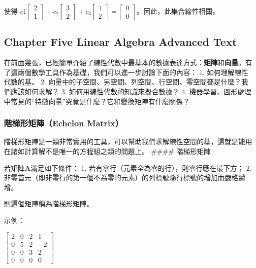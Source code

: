 \documentclass[11pt]{article}
\begin{document}
{使得
\(c1 \begin{bmatrix}2 \\ 1\end{bmatrix} + c_2 \begin{bmatrix}3 \\ 2\end{bmatrix} + c_3 \begin{bmatrix}1 \\ 2 \end{bmatrix} = \begin{bmatrix}0 \\ 0\end{bmatrix}\)。因此，此集合線性相關。

    \hypertarget{chapter-five-linear-algebra-advanced-text}{%
\subsection{Chapter Five Linear Algebra Advanced
Text}\label{chapter-five-linear-algebra-advanced-text}}

在前面幾張，已經簡單介紹了線性代數中最基本的數據表達方式：\textbf{矩陣}和\textbf{向量}。有了這兩個數學工具作為基礎，我們可以進一步討論下面的內容：
1. 如何理解線性代數的基。 2.
向量中的子空間、另空間、列空間、行空間、零空間都是什麼？我們應該如何求解？
3. 如何用線性代數的知識來擬合數據？ 4.
機器學習、圖形處理中常見的``特徵向量''究竟是什麼？它和變換矩陣有什麼關係？

    \hypertarget{ux968eux68afux5f62ux77e9ux9663echelon-matrix}{%
\subsubsection{階梯形矩陣（Echelon
Matrix）}\label{ux968eux68afux5f62ux77e9ux9663echelon-matrix}}

階梯形矩陣是一類非常實用的工具，可以幫助我們求解線性空間的基，這就是能用在諸如計算解不是唯一的方程組之類的問題上。
\#\#\#\# 階梯形矩陣

若矩陣\(\mathbf{A}\)滿足如下條件： 1.
若有零行（元素全為零的行），則零行應在最下方； 2.
非零首元（即非零行的第一個不為零的元素）的列標號隨行標號的增加而嚴格遞增。

則這個矩陣稱為階梯形矩陣。

    示例：

\(\begin{bmatrix} 2 & 0 & 2 & 1 \\ 0 & 5 & 2 & -2 \\ 0 & 0 & 3 & 2 \\ 0 & 0 & 0 & 0 \end{bmatrix}\)

}
\end{document}
